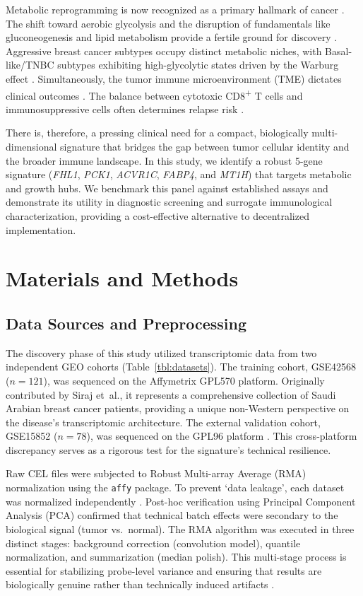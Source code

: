\documentclass[a4paper,fleqn]{cas-dc}
\newcommand{\gene}[1]{\textit{#1}}
\begin{document}
Metabolic reprogramming is now recognized as a primary hallmark of cancer \citep{hanahan2011,pavlova2016}. The shift toward aerobic glycolysis and the disruption of fundamentals like gluconeogenesis and lipid metabolism provide a fertile ground for discovery \citep{deberardinis2016,faubert2020}. Aggressive breast cancer subtypes occupy distinct metabolic niches, with Basal-like/TNBC subtypes exhibiting high-glycolytic states driven by the Warburg effect \citep{zhang2024a,fang2024}. Simultaneously, the tumor immune microenvironment (TME) dictates clinical outcomes \citep{thorsson2018}. The balance between cytotoxic CD8\textsuperscript{+} T cells and immunosuppressive cells often determines relapse risk \citep{denkert2018,loi2019,newman2015,schmid2018}.

There is, therefore, a pressing clinical need for a compact, biologically multi-dimensional signature that bridges the gap between tumor cellular identity and the broader immune landscape. In this study, we identify a robust 5-gene signature (\gene{FHL1}, \gene{PCK1}, \gene{ACVR1C}, \gene{FABP4}, and \gene{MT1H}) that targets metabolic and growth hubs. We benchmark this panel against established assays and demonstrate its utility in diagnostic screening and surrogate immunological characterization, providing a cost-effective alternative to decentralized implementation.

\section{Materials and Methods}\label{sec:methods}

\subsection{Data Sources and Preprocessing}\label{sec:data}
The discovery phase of this study utilized transcriptomic data from two independent GEO cohorts (Table~\ref{tbl:datasets}). The training cohort, GSE42568 ($n=121$), was sequenced on the Affymetrix GPL570 platform. Originally contributed by Siraj et~al., it represents a comprehensive collection of Saudi Arabian breast cancer patients, providing a unique non-Western perspective on the disease's transcriptomic architecture. The external validation cohort, GSE15852 ($n=78$), was sequenced on the GPL96 platform \citep{sims2014}. This cross-platform discrepancy serves as a rigorous test for the signature's technical resilience.

Raw CEL files were subjected to Robust Multi-array Average (RMA) normalization using the \texttt{affy} package. To prevent `data leakage', each dataset was normalized independently \citep{sims2014}. Post-hoc verification using Principal Component Analysis (PCA) confirmed that technical batch effects were secondary to the biological signal (tumor vs.\ normal). The RMA algorithm was executed in three distinct stages: background correction (convolution model), quantile normalization, and summarization (median polish). This multi-stage process is essential for stabilizing probe-level variance and ensuring that results are biologically genuine rather than technically induced artifacts \citep{sun2024}.
\end{document}
